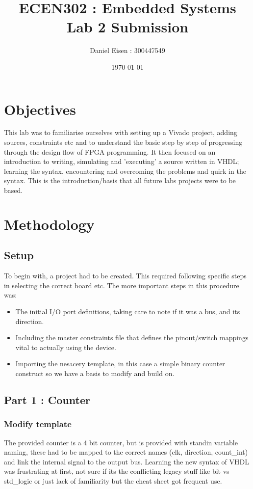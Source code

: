 \documentclass[11pt]{article}
\title{ECEN302 : Embedded Systems \\ Lab 2 Submission}
\author{Daniel Eisen : 300447549}
\date{\today}
\begin{document}
\begin{preview}
\maketitle
\section{Objectives}
This lab was to familiarise ourselves with setting up a Vivado project, adding sources, constraints etc and to understand the basic step by step of progressing through the design flow of FPGA programming. It then focused on an introduction to writing, simulating and 'executing' a source written in VHDL; learning the syntax, encountering and overcoming the problems and quirk in the syntax. This is the introduction/basis that all future labs projects were to be based. 

\section{Methodology}
        \subsection{Setup}
        To begin with, a project had to be created. This required following specific steps in selecting the correct board etc. 
        The more important steps in this procedure was:
        \begin{itemize}
                \item The initial I/O port definitions, taking care to note if it was a bus, and its direction.
                \item Including the master constraints file that defines the pinout/switch mappings vital to actually using the device.
                \item Importing the nesacery template, in this case a simple binary counter construct so we have a basis to modify and build on. 
        \end{itemize}
          
        \subsection{Part 1 : Counter}
        \subsubsection*{Modify template}
        The provided counter is a 4 bit counter, but is provided with standin variable naming, these had to be mapped to the correct names (clk, direction, count\_int) and link the internal signal to the output bus. 
        Learning the new syntax of VHDL was frustrating at first, not sure if its the conflicting legacy stuff like bit vs std\_logic or just lack of familiarity but the cheat sheet got frequent use.

\end{preview}
\end{document}
